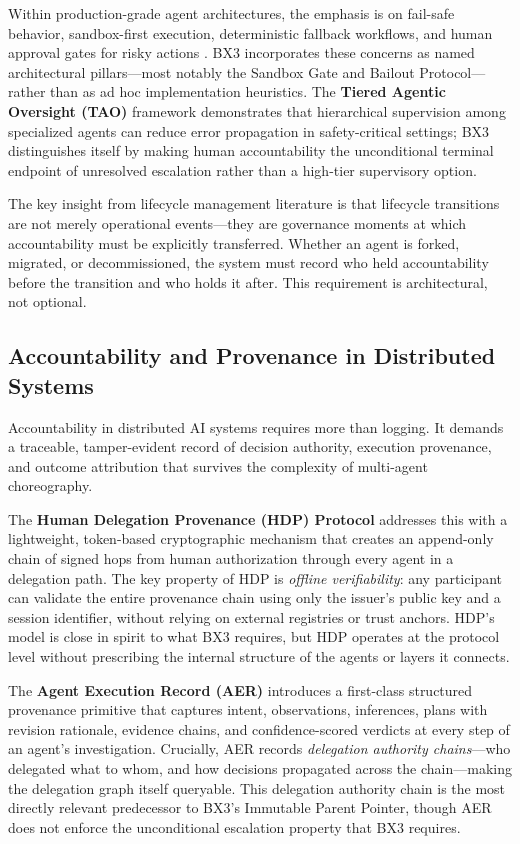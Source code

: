 Within production-grade agent architectures, the emphasis is on fail-safe behavior, sandbox-first execution, deterministic fallback workflows, and human approval gates for risky actions \cite{alenezi2026}. BX3 incorporates these concerns as named architectural pillars---most notably the Sandbox Gate and Bailout Protocol---rather than as ad hoc implementation heuristics. The \textbf{Tiered Agentic Oversight (TAO)} framework \cite{kim2025tao} demonstrates that hierarchical supervision among specialized agents can reduce error propagation in safety-critical settings; BX3 distinguishes itself by making human accountability the unconditional terminal endpoint of unresolved escalation rather than a high-tier supervisory option.

The key insight from lifecycle management literature is that lifecycle transitions are not merely operational events---they are governance moments at which accountability must be explicitly transferred. Whether an agent is forked, migrated, or decommissioned, the system must record who held accountability before the transition and who holds it after. This requirement is architectural, not optional.

\subsection{Accountability and Provenance in Distributed Systems}

Accountability in distributed AI systems requires more than logging. It demands a traceable, tamper-evident record of decision authority, execution provenance, and outcome attribution that survives the complexity of multi-agent choreography.

The \textbf{Human Delegation Provenance (HDP) Protocol} \cite{hdp2025arxiv} addresses this with a lightweight, token-based cryptographic mechanism that creates an append-only chain of signed hops from human authorization through every agent in a delegation path. The key property of HDP is \textit{offline verifiability}: any participant can validate the entire provenance chain using only the issuer's public key and a session identifier, without relying on external registries or trust anchors. HDP's model is close in spirit to what BX3 requires, but HDP operates at the protocol level without prescribing the internal structure of the agents or layers it connects.

The \textbf{Agent Execution Record (AER)} \cite{proml2022} introduces a first-class structured provenance primitive that captures intent, observations, inferences, plans with revision rationale, evidence chains, and confidence-scored verdicts at every step of an agent's investigation. Crucially, AER records \textit{delegation authority chains}---who delegated what to whom, and how decisions propagated across the chain---making the delegation graph itself queryable. This delegation authority chain is the most directly relevant predecessor to BX3's Immutable Parent Pointer, though AER does not enforce the unconditional escalation property that BX3 requires.

